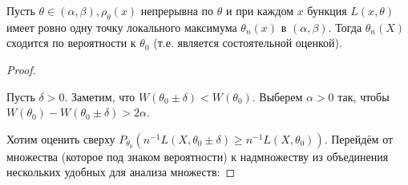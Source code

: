 \begin{proposal}
    Пусть $\theta \in(\alpha, \beta), \rho_{\theta}(x)$ непрерывна по $\theta$ и при каждом $x$ бункция $L(x, \theta)$ имеет ровно одну точку локального максимума $\theta_{n}(x)$ в $(\alpha, \beta) .$ Тогда $\theta_{n}(X)$ сходится по вероятности к $\theta_{0}$ (т.е. является состоятельной оценкой).
\end{proposal}
\begin{proof} \,
    
    Пусть $\delta>0$. Заметим, что $W\left(\theta_{0} \pm \delta\right)<W\left(\theta_{0}\right)$. Выберем $\alpha>0$ так, чтобы $W\left(\theta_{0}\right)-W\left(\theta_{0} \pm \delta\right)>2 \alpha$.
    
    Хотим оценить сверху $P_{\theta_{0}}(n^{-1}L(X,\theta_{0}\pm\delta)\geq n^{-1}L(X,\theta_{0}))$. Перейдём от множества (которое под знаком вероятности) к надмножеству из объединения нескольких удобных для анализа множеств:

\end{proof}
